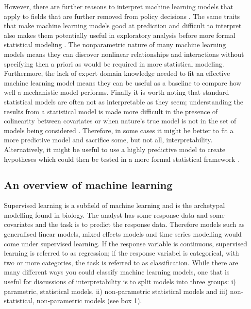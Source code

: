 \documentclass[10pt,]{article}
\begin{document}
However, there are further reasons to interpret machine learning models that apply to fields that are further removed from policy decisions \citep{elith2009species}.
The same traits that make machine learning models good at prediction and difficult to interpret also makes them potentially useful in exploratory analysis before more formal statistical modeling \citep{zhao2017causal}.
The nonparametric nature of many machine learning models means they can discover nonlinear relationships and interactions without specifying then a priori as would be required in more statistical modeling.
Furthermore, the lack of expert domain knowledge needed to fit an effective machine learning model means they can be useful as a baseline to compare how well a mechanistic model performs.
Finally it is worth noting that standard statistical models are often not as interpretable as they seem; understanding the results from a statistical model is made more difficult in the presence of colinearity between covariates or when nature's true model is not in the set of models being considered \citep{lyddon2018nonparametric, yao2017using}.
Therefore, in some cases it might be better to fit a more predictive model and sacrifice some, but not all, interpretability.
Alternatively, it might be useful to use a highly predictive model to create hypotheses which could then be tested in a more formal statistical framework \citep{zhao2017causal}.

\subsection{An overview of machine learning}\label{an-overview-of-machine-learning}

Supervised learning is a subfield of machine learning and is the archetypal modelling found in biology.
The analyst has some response data and some covariates and the task is to predict the response data.
Therefore models such as generalised linear models, mixed effects models and time series modelling would come under supervised learning.
If the response variable is continuous, supervised learning is referred to as regression; if the response  variabel is categorical, with two or more categories, the task is referred to as classification.
While there are many different ways you could classify machine learning models, one that is useful for discussions of interpretability is to split models into three groups: i) parametric, statistical models, ii) non-parametric statistical models and iii) non-statistical, non-parametric models (see box 1).
\end{document}
